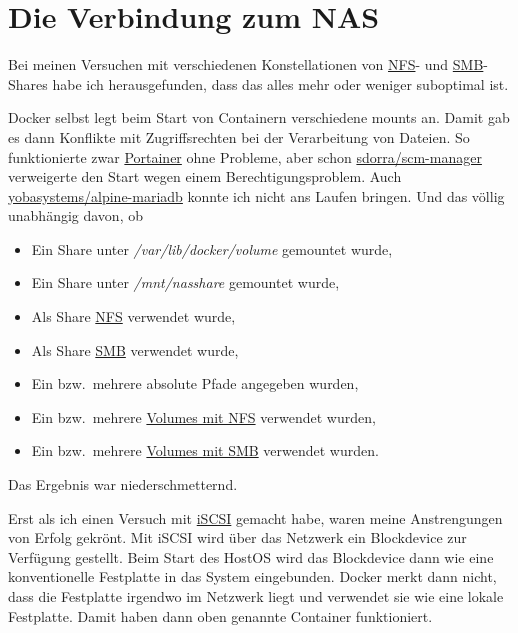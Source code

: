 \documentclass[12pt,a4paper]{article}
\newcommand{\code}[1]{\textit{#1}}
\begin{document}
\section{Die Verbindung zum NAS}
Bei meinen Versuchen mit verschiedenen Konstellationen von \href{https://de.wikipedia.org/wiki/Network_File_System}{NFS}-
und \href{https://de.wikipedia.org/wiki/Server_Message_Block}{SMB}-Shares habe ich herausgefunden, dass das alles mehr
oder weniger suboptimal ist.

Docker selbst legt beim Start von Containern verschiedene mounts an. Damit gab es dann Konflikte mit Zugriffsrechten bei
der Verarbeitung von Dateien. So funktionierte zwar \href{https://hub.docker.com/r/portainer/portainer/}{Portainer} ohne
Probleme, aber schon \href{https://hub.docker.com/r/sdorra/scm-manager}{sdorra/scm-manager} verweigerte den Start wegen
einem Berechtigungsproblem. Auch \href{https://hub.docker.com/r/yobasystems/alpine-mariadb}{yobasystems/alpine-mariadb}
konnte ich nicht ans Laufen bringen. Und das völlig unabhängig davon, ob

\begin{itemize}
    \item Ein Share unter \code{/var/lib/docker/volume} gemountet wurde,
    \item Ein Share unter \code{/mnt/nasshare} gemountet wurde,
    \item Als Share \href{https://de.wikipedia.org/wiki/Network_File_System}{NFS} verwendet wurde,
    \item Als Share \href{https://de.wikipedia.org/wiki/Server_Message_Block}{SMB} verwendet wurde,
    \item Ein bzw.\ mehrere absolute Pfade angegeben wurden,
    \item Ein bzw.\ mehrere \href{https://nerdblog.steinkopf.net/2017/12/persistente-docker-volumes-mit-nfs-und-cifs/}{Volumes mit NFS} verwendet wurden,
    \item Ein bzw.\ mehrere \href{https://nerdblog.steinkopf.net/2017/12/persistente-docker-volumes-mit-nfs-und-cifs/}{Volumes mit SMB} verwendet wurden.
\end{itemize}

Das Ergebnis war niederschmetternd.

Erst als ich einen Versuch mit \href{https://de.wikipedia.org/wiki/ISCSI}{iSCSI} gemacht habe, waren meine Anstrengungen
von Erfolg gekrönt. Mit iSCSI wird über das Netzwerk ein Block\-device zur Verfügung gestellt. Beim Start des HostOS
wird das Blockdevice dann wie eine konventionelle Festplatte in das System eingebunden. Docker merkt dann nicht, dass
die Festplatte irgendwo im Netzwerk liegt und verwendet sie wie eine lokale Festplatte. Damit haben dann oben genannte
Container funktioniert.
\end{document}
